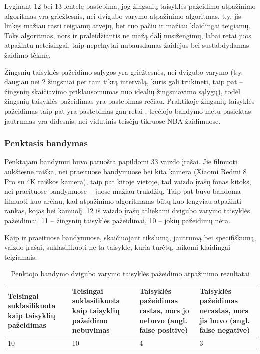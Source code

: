 \documentclass{VUMIFPSbakalaurinis}
\begin{document}
Lyginant 12 bei 13 lentelę pastebima, jog žingsnių taisyklės pažeidimo atpažinimo algoritmas yra griežtesnis, nei dvigubo varymo atpažinimo algoritmas, t.y. jis linkęs mažiau rasti teigiamų atvejų, bet tuo pačiu ir mažiau klaidingai teigiamų. Toks algoritmas, nors ir praleidžiantis ne mažą dalį nusižengimų, labai retai juos atpažintų neteisingai, taip nepelnytai nubausdamas žaidėjus bei sustabdydamas žaidimo tėkmę. 

Žingsnių taisyklės pažeidimo sąlygos yra griežtesnės, nei dvigubo varymo (t.y. daugiau nei 2 žingsniai per tam tikrą intervalą, kuris gali trūkinėti, taip pat – žingsnių skaičiavimo priklausomumas nuo idealių žingsniavimo sąlygų), todėl žingsnių taisyklės pažeidimas yra pastebimas rečiau. Praktikoje žingsnių taisyklės pažeidimas taip pat yra pastebimas gan retai \cite{SiglerK}, trečiojo bandymo metu pasiektas jautrumas yra didesnis, nei vidutinis teisėjų tikruose NBA žaidimuose. 

\subsubsection{Penktasis bandymas}

Penktajam bandymui buvo paruošta papildomi 33 vaizdo įrašai. Jie filmuoti aukštesne raiška, nei praeituose bandymuose bei kita kamera (Xiaomi Redmi 8 Pro su 4K raiškos kamera), taip pat kitoje vietoje, tad vaizdo įrašų fonas kitoks, nei praeituose bandymuose – juose mažiau trukdžių. Taip pat buvo bandoma filmuoti kuo arčiau, kad atpažinimo algoritmams būtų kuo lengviau atpažinti rankas, kojas bei kamuolį. 12 iš vaizdo įrašų atliekami dvigubo varymo taisyklės pažeidimai, 11 – žingsnių taisyklės pažeidimai, 10 – jokių pažeidimų nėra. 

Kaip ir praeituose bandymuose, skaičiuojant tikslumą, jautrumą bei specifiškumą, vaizdo įrašai, suklasifikuoti ne ta taisykle, kuria turėtų, laikomi klaidingai teigiamais. 

\begin{table}[H]\footnotesize
	\centering
	\caption{Penktojo bandymo dvigubo varymo taisyklės pažeidimo atpažinimo rezultatai}
	{\begin{tabular}{|p{3cm}|p{3cm}|p{3cm}|p{2cm}|} \hline
			\textbf{Teisingai suklasifikuota kaip taisyklių pažeidimas} & \textbf{Teisingai suklasifikuota kaip taisyklių pažeidimo nebuvimas} & \textbf{Taisyklės pažeidimas rastas, nors jo nebuvo (angl. false positive)} & \textbf{Taisyklės pažeidimas nerastas, nors jis buvo (angl. false negative)} \\
			\hline
			10  & 10    & 4    & 3   \\
			\hline
	\end{tabular}}
	\label{tab:fifth_trial}
\end{table}
\end{document}
